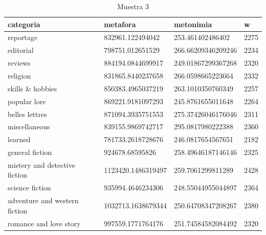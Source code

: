 \documentclass[12pt,letterpaper,twoside]{article}
\begin{document}
\begin{center}
        \begin{longtable}{| p{} | p{} | p{}|p{}|}
\caption{Muestra 3}
    \hline
          categoria & metafora & metonimia & w \\ \hline
        reportage & 832961.122494042 & 253.461402486402 & 2275 \\ \hline
        editorial & 798751.012651529 & 266.66209346209246 & 2234 \\ \hline
        reviews & 884194.0844699917 & 249.01867299367268 & 2320 \\ \hline
        religion & 831865.8440237658 & 266.0598665223664 & 2332 \\ \hline
        skills \& hobbies & 850383.4965037219 & 263.1010350760349 & 2257 \\ \hline
        popular lore & 869221.9181097293 & 245.8761655011648 & 2264 \\ \hline
        belles lettres & 871094.3935751553 & 275.37426046176046 & 2311 \\ \hline
        miscellaneous & 839155.9869742717 & 295.0817980222388 & 2360 \\ \hline
        learned & 781733.2618728676 & 246.0817654567651 & 2182 \\ \hline
        general fiction & 924678.68595826 & 258.49646187146146 & 2325 \\ \hline
        mistery and detective fiction & 1123420.1486319497 & 259.7061299811289 & 2428 \\ \hline
        science fiction & 935994.4646234306 & 248.55044955044897 & 2364 \\ \hline
        adventure and western fiction & 1032713.1638679344 & 250.64708347208267 & 2380 \\ \hline
        romance and love story & 997559.1771764176 & 251.74584582084492 & 2320 \\ \hline
\end{longtable}
    \label{muestra3}
\end{center}
\end{document}
